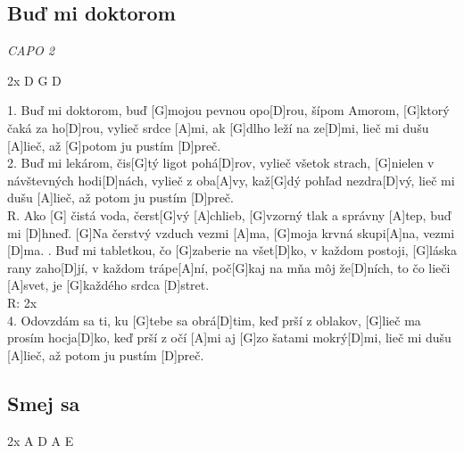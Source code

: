 \documentclass[10pt]{article}
\begin{document}
\begin{Large}
\begin{minipage}{\textwidth}
\subsection{Buď mi doktorom}
\textit{CAPO 2}
\begin{multicols*}{2}
\begin{guitar}
	2x D G D
	
	1.
	Buď mi doktorom, 
	buď [G]mojou pevnou opo[D]rou,
	šípom Amorom, [G]ktorý čaká za ho[D]rou,
	vylieč srdce [A]mi, ak [G]dlho leží na ze[D]mi,
	lieč mi dušu [A]lieč, až [G]potom ju pustím [D]preč.
	\\
	2.
	Buď mi lekárom, čis[G]tý ligot pohá[D]rov,
	vylieč všetok strach, 
	[G]nielen v návštevných hodi[D]nách,
	vylieč z oba[A]vy, kaž[G]dý pohľad nezdra[D]vý,
	lieč mi dušu [A]lieč, až potom ju pustím [D]preč.
	\\
	R.
	Ako [G] čistá voda, čerst[G]vý [A]chlieb,
	[G]vzorný tlak a správny [A]tep,
	buď mi [D]hneď.
	[G]Na čerstvý vzduch vezmi [A]ma,
	[G]moja krvná skupi[A]na,
	vezmi [D]ma.
	.
	Buď mi tabletkou, čo [G]zaberie na všet[D]ko,
	v každom postoji, [G]láska rany zaho[D]jí,
	v každom trápe[A]ní, 
	poč[G]kaj na mňa môj že[D]ních,
	to čo lieči [A]svet, je [G]každého srdca [D]stret.
 	\\
	R: 2x
 	\\
	4.
	Odovzdám sa ti, ku [G]tebe sa obrá[D]tim,
	keď prší z oblakov, [G]lieč ma prosím hocja[D]ko,
	keď prší z očí [A]mi aj  [G]zo šatami mokrý[D]mi,
	lieč mi dušu [A]lieč, až potom ju pustím [D]preč.
\end{guitar}
\end{multicols*}
\end{minipage}

\begin{minipage}{\textwidth}
\subsection{Smej sa}
\begin{multicols}{2}
\begin{guitar}
	2x A D A E
	

\end{guitar}
\end{multicols}
\end{minipage}
\end{Large}
\end{document}
